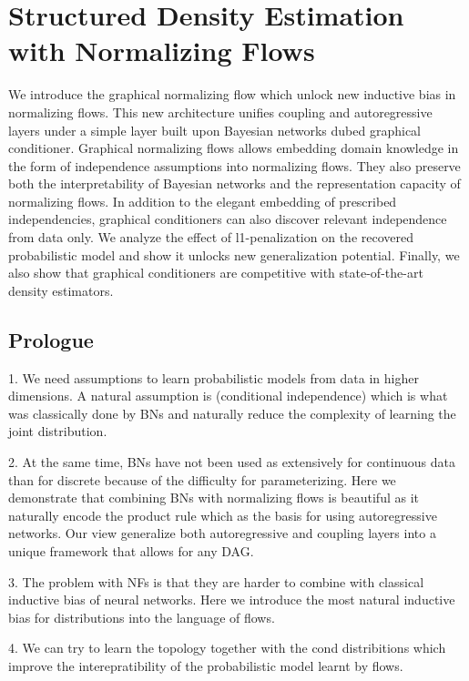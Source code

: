 

\chapter{Structured Density Estimation with Normalizing Flows}\label{ch:06}

\begin{chapter_outline}
  We introduce the graphical normalizing flow which unlock new inductive bias in normalizing flows. This new architecture unifies coupling and autoregressive layers under a simple layer built upon Bayesian networks dubed graphical conditioner. Graphical normalizing flows allows embedding domain knowledge in the form of independence assumptions into normalizing flows. They also preserve both the interpretability of Bayesian networks and the representation capacity of normalizing flows. In addition to the elegant embedding of prescribed independencies, graphical conditioners can also discover relevant independence from data only. We analyze the effect of l1-penalization on the recovered probabilistic model and show it unlocks new generalization potential. Finally, we also show that graphical conditioners are competitive with state-of-the-art density estimators.
\end{chapter_outline}

\section{Prologue}

1. We need assumptions to learn probabilistic models from data in higher dimensions. A natural assumption is (conditional independence) which is what was classically done by BNs and naturally reduce the complexity of learning the joint distribution.

2. At the same time, BNs have not been used as extensively for continuous data than for discrete because of the difficulty for parameterizing. Here we demonstrate that combining BNs with normalizing flows is beautiful as it naturally encode the product rule which as the basis for using autoregressive networks. Our view generalize both autoregressive and coupling layers into a unique framework that allows for any DAG.

3. The problem with NFs is that they are harder to combine with classical inductive bias of neural networks. Here we introduce the most natural inductive bias for distributions into the language of flows.

4. We can try to learn the topology together with the cond distribitions which improve the interepratibility of the probabilistic model learnt by flows.

